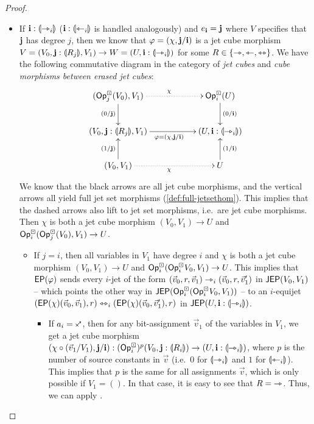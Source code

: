 \documentclass[a4paper]{memoir}
\begin{document}
\begin{proof}
\begin{itemize}
		\item If $\mathbf{i} : {\llparenthesis \rightarrowtriangle_i \rrparenthesis}$ ($\mathbf{i} : {\llparenthesis \leftarrowtriangle_i \rrparenthesis}$ is handled analogously) and $e_{\mathbf{i}} = \mathbf{j}$ where $V$ specifies that $\mathbf{j}$ has degree $j$, then we know that $\varphi = (\chi, \mathbf{j} / \mathbf{i})$ is a jet cube morphism $V = (V_0, \mathbf{j} : {\llparenthesis R_j \rrparenthesis}, V_1) \to W = (U, \mathbf{i} : {\llparenthesis \rightarrowtriangle_i \rrparenthesis})$ for some $R \in \mathopen{}\left\{ \rightarrowtriangle, \leftarrowtriangle, \leftrightarrowtriangle \right\}\mathclose{}$.
		We have the following commutative diagram in the category of \emph{jet cubes} and \emph{cube morphisms between erased jet cubes}:
		\[
			\xymatrix{
				(\Opcube_j(V_0), V_1)
					\ar[d]_{(0/\dm j)}
					\ar@{.>}[rr]^\chi
				&&
				\Opcube_i(U)
					\ar[d]^{(0/\dm i)}
				\\
				(V_0, \dm j : \rival{R_j}, V_1)
					\ar[rr]_{\vfi = (\chi, \dm j / \dm i)}
				&& (U, \dm i : \rival{\jet_i})
				\\
				(V_0, V_1)
					\ar[u]^{(1/\dm j)}
					\ar@{.>}[rr]_\chi
				&&
				U
					\ar[u]_{(1/\dm i)}
			}
		\]
		We know that the black arrows are all jet cube morphisms, and the vertical arrows all yield full jet set morphisms (\cref{def:full-jetsethom}).
		This implies that the dashed arrows also lift to jet set morphisms, i.e.\ are jet cube morphisms.
		Then $\chi$ is both a jet cube morphism $(V_0, V_1) \to U$ and ${\mathsf{Op}}^\boxdot_i({\mathsf{Op}}^\boxdot_j(V_0), V_1) \to U$.
		\begin{itemize}
			\item If $j = i$, then all variables in $V_1$ have degree $i$ and $\chi$ is both a jet cube morphism $(V_0, V_1) \to U$ and ${\mathsf{Op}}^\boxdot_i({\mathsf{Op}}^\boxdot_i V_0, V_1) \to U$.
			This implies that $\mathsf{EP}(\varphi)$ sends every $i$-jet of the form $(\vec v_0, r, \vec v_1) \rightarrowtriangle_i (\vec v_0, r, \vec v_1')$ in $\mathsf{JEP}(V_0, V_1)$ -- which points the other way in $\mathsf{JEP}({\mathsf{Op}}^\boxdot_i({\mathsf{Op}}^\boxdot_i V_0, V_1))$ -- to an $i$-equijet $(\mathsf{EP}(\chi)(\vec v_0, \vec v_1), r) \leftrightarrowtriangle_i (\mathsf{EP}(\chi)(\vec v_0, \vec v'_1), r)$ in $\mathsf{JEP}(U, \mathbf{i} : {\llparenthesis \rightarrowtriangle_i \rrparenthesis})$.
			\begin{itemize}
				\item If $a_i = \ypolar$, then for any bit-assignment $\vec v_1$ of the variables in $V_1$, we get a jet cube morphism $(\chi \circ (\vec v_1/V_1), \mathbf{j} / \mathbf{i}) : ({\mathsf{Op}}^\boxdot_i)^p(V_0, \mathbf{j} : {\llparenthesis R_i \rrparenthesis}) \to (U, \mathbf{i} : {\llparenthesis \rightarrowtriangle_i \rrparenthesis})$, where $p$ is the number of source constants in $\vec v$ (i.e.\ $0$ for ${\llparenthesis \rightarrowtriangle_i \rrparenthesis}$ and $1$ for ${\llparenthesis \leftarrowtriangle_i \rrparenthesis}$).
				This implies that $p$ is the same for all assignments $\vec v$, which is only possible if $V_1 = ()$.
				In that case, it is easy to see that $R = {\rightarrowtriangle}$.
				Thus, we can apply .
				

\end{itemize}
\end{itemize}
\end{itemize}
\end{proof}
\end{document}
